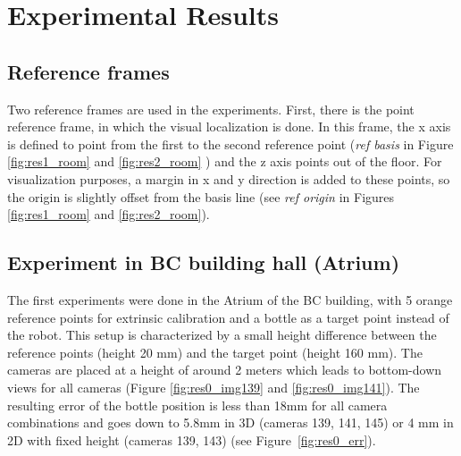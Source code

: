 \section{Experimental Results}

\subsection{Reference frames}
Two reference frames are used in the experiments. First, there is the point reference frame, in which the visual localization is done. 
In this frame, the x axis is defined to point from the first to the second reference point (\textit{ref basis} in Figure \ref{fig:res1_room} and \ref{fig:res2_room} ) and the z axis points out of the floor.
For visualization purposes, a margin in x and y direction is added to these points, so the origin is slightly offset from the basis line (see \textit{ref origin} in Figures \ref{fig:res1_room} and \ref{fig:res2_room}).

\subsection{Experiment in BC building hall (Atrium)}
The first experiments were done in the Atrium of the BC building, with 5 orange reference points for extrinsic calibration and a bottle as a target point instead of the robot.
This setup is characterized by a small height difference between the reference points (height 20 mm) and the target point (height 160 mm). 
The cameras are placed at a height of around 2 meters which leads to bottom-down views for all cameras (Figure \ref{fig:res0_img139} and \ref{fig:res0_img141}).
The resulting error of the bottle position is less than 18mm for all camera combinations and goes down to 5.8mm in 3D (cameras 139, 141, 145) or 4 mm in 2D with fixed height (cameras 139, 143) (see Figure~\ref{fig:res0_err}). 

